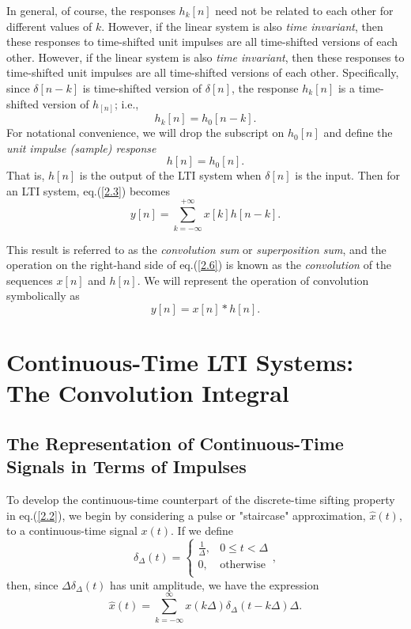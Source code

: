 \documentclass[a4paper,twoside]{book}
\begin{document}
In general, of course, the responses $h_k[n]$ need not be related to each other for different values of $k$. However, if the linear system is also \textit{time invariant}, then these responses to time-shifted unit impulses are all time-shifted versions of each other. However, if the linear system is also \textit{time invariant}, then these responses to time-shifted unit impulses are all time-shifted versions of each other. Specifically, since $\delta[n-k]$ is time-shifted version of $\delta[n]$, the response $h_k[n]$ is a time-shifted version of $h_[n]$; i.e.,
\begin{equation}
    h_k[n]=h_0[n-k].
    \label{2.4}
\end{equation}
For notational convenience, we will drop the subscript on $h_0[n]$ and define the \textit{unit impulse (sample) response}
\begin{equation}
    h[n]=h_0[n].
    \label{2.5}
\end{equation}
That is, $h[n]$ is the output of the LTI system when $\delta[n]$ is the input. Then for an LTI system, eq.\;(\ref{2.3}) becomes
\begin{equation}
    \boxed{y[n] = \sum_{k = -\infty}^{+\infty}x[k]h[n-k].}
    \label{2.6}
\end{equation}

This result is referred to as the \textit{convolution sum} or \textit{superposition sum}, and the operation on the right-hand side of eq.\;(\ref{2.6}) is known as the \textit{convolution} of the sequences $x[n]$ and $h[n]$. We will represent the operation of convolution symbolically as
\begin{equation}
    y[n]=x[n]*h[n].
    \label{2.7}
\end{equation}

\section{Continuous-Time LTI Systems: The Convolution Integral}
\subsection{The Representation of Continuous-Time Signals in Terms of Impulses}

To develop the continuous-time counterpart of the discrete-time sifting property in eq.\;(\ref{2.2}), we begin by considering a pulse or "staircase" approximation, $\hat{x}(t)$, to a continuous-time signal $x(t)$. If we define
\begin{equation}
    \left.\delta_{\Delta}(t) = \left\{\begin{array}{ll}{\frac{1}{\Delta},}&{0\leq t<\Delta}\\{0,}&{\mathrm{otherwise}}\\\end{array}\right.,\right.
    \label{2.24}
\end{equation}
then, since $\Delta\delta_\Delta(t)$ has unit amplitude, we have the expression
\begin{equation}
    \hat{x}(t) = \sum_{k = -\infty}^{\infty}x(k\Delta)\delta_{\Delta}(t - k\Delta)\Delta.
    \label{2.25}
\end{equation}
\end{document}
